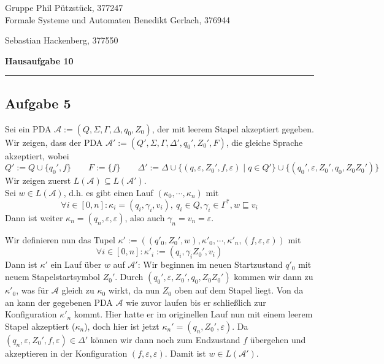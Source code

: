 \documentclass[a4paper,graphics,11pt]{article}
\newcommand{\aufgabe}[1]{\subsection*{Aufgabe #1}}
\begin{document}
\noindent Gruppe              \hfill Phil Pützstück, 377247\\
\noindent Formale Systeme und Automaten \hfill Benedikt Gerlach, 376944\\
\strut\hfill Sebastian Hackenberg, 377550\\
\begin{center}
	\LARGE{\textbf{Hausaufgabe 10}}
\end{center}
\begin{center}
\rule[0.1ex]{\textwidth}{1pt}
\end{center}



\aufgabe{5}
Sei ein PDA $\mathcal{A} := (Q, \Sigma, \Gamma, \Delta, q_0, Z_0)$, der mit
leerem Stapel akzeptiert gegeben.\\
Wir zeigen, dass der PDA $\mathcal{A}' := (Q', \Sigma, \Gamma, \Delta', q_0', Z_0', F)$,
die gleiche Sprache akzeptiert,
wobei
$$
    Q' := Q \cup \{q_0',f\}\qquad
    F := \{f\}\qquad
    \Delta' := \Delta \cup \{(q, \varepsilon, Z_0', f, \varepsilon) \mid q \in Q'\} \cup \{(q_0', \varepsilon, Z_0', q_0, Z_0Z_0')\}
$$
Wir zeigen zuerst $L(\mathcal{A}) \subseteq L(\mathcal{A}')$.\\
Sei $w \in L(\mathcal{A})$, d.h. es gibt einen Lauf $(\kappa_0, \cdots, \kappa_n)$
mit
$$
    \forall i \in [0,n] : \kappa_i = (q_i, \gamma_i, v_i),\ q_i \in Q, \gamma_i \in \Gamma^*, w \sqsubseteq v_i
$$
Dann ist weiter $\kappa_n = (q_n, \varepsilon, \varepsilon)$, also auch $\gamma_n = v_n = \varepsilon$.

Wir definieren nun das Tupel $\kappa' := ((q'_0, Z_0', w), \kappa'_0, \cdots, \kappa'_n, (f, \varepsilon, \varepsilon))$ mit
$$
    \forall i \in [0,n] : \kappa'_i := (q_i, \gamma_iZ_0',v_i)
$$
Dann ist $\kappa'$ ein Lauf über $w$ auf $\mathcal{A}'$: Wir beginnen im neuen Startzustand $q'_0$ mit neuem
Stapelstartsymbol $Z_0'$. Durch $(q_0', \varepsilon, Z_0', q_0, Z_0Z_0')$ kommen wir dann zu $\kappa'_0$,
was für $\mathcal{A}$ gleich zu $\kappa_0$ wirkt, da nun $Z_0$ oben auf dem Stapel liegt.
Von da an kann der gegebenen PDA $\mathcal{A}$ wie zuvor laufen bis er schließlich zur Konfiguration
$\kappa'_n$ kommt. Hier hatte er im originellen Lauf nun mit einem leerem Stapel akzeptiert ($\kappa_n$), doch
hier ist jetzt $\kappa_n' = (q_n, Z_0', \varepsilon)$. Da $(q_n, \varepsilon, Z_0', f, \varepsilon) \in \Delta'$
können wir dann noch zum Endzustand $f$ übergehen und akzeptieren in der Konfiguration $(f,\varepsilon,\varepsilon)$.
Damit ist $w \in L(\mathcal{A}')$.
\end{document}
